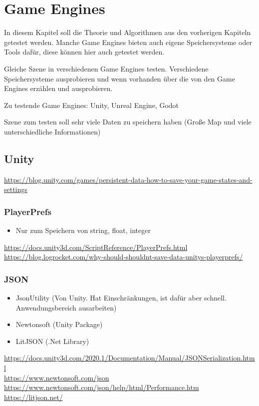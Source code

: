 \chapter{Game Engines}\label{ch:gameengines}
In diesem Kapitel soll die Theorie und Algorithmen aus den vorherigen Kapiteln 
getestet werden. Manche Game Engines bieten auch eigene Speichersysteme oder
Tools dafür, diese können hier auch getestet werden.

Gleiche Szene in verschiedenen Game Engines testen. 
Verschiedene Speichersysteme ausprobieren und wenn vorhanden über die von den Game Engines erzählen und ausprobieren.

Zu testende Game Engines: Unity, Unreal Engine, Godot

Szene zum testen soll sehr viele Daten zu speichern haben (Große Map und viele unterschiedliche Informationen)

\section{Unity}
\url{https://blog.unity.com/games/persistent-data-how-to-save-your-game-states-and-settings}


\subsection{PlayerPrefs}
\begin{itemize}
    \item Nur zum Speichern von string, float, integer
\end{itemize}

\url{https://docs.unity3d.com/ScriptReference/PlayerPrefs.html}\\
\url{https://blog.logrocket.com/why-should-shouldnt-save-data-unitys-playerprefs/}

\subsection{JSON}
\begin{itemize}
    \item JsonUtility (Von Unity. Hat Einschränkungen, ist dafür aber schnell. Anwendungsbereich ausarbeiten)
    \item Newtonsoft (Unity Package)
    \item LitJSON (.Net Library)
\end{itemize}

\url{https://docs.unity3d.com/2020.1/Documentation/Manual/JSONSerialization.html}\\
\url{https://www.newtonsoft.com/json}\\
\url{https://www.newtonsoft.com/json/help/html/Performance.htm}
\url{https://litjson.net/}

